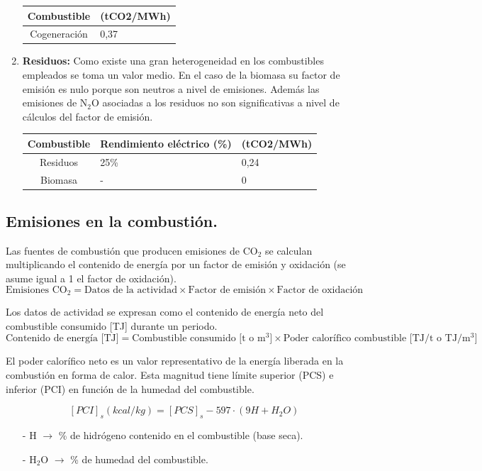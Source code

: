 \begin{enumerate}
\begin{table}[H]
\begin{tabular}{cm{2cm}}
				\textbf{Combustible}  & (tCO2/MWh)\\  
				\hline
				Cogeneración & 0,37
				\\
				\hline
			\end{tabular}
		\end{table}
	\item \textbf{Residuos:}
		Como existe una gran heterogeneidad en los combustibles empleados se toma un valor medio. En el caso de la biomasa su factor de emisión es nulo porque son neutros a nivel de emisiones. Además las emisiones de N$_2$O asociadas a los residuos no son significativas a nivel de cálculos del factor de emisión.
		\begin{table}[H]
			\centering
			\renewcommand{\arraystretch}{1.1}
			\begin{tabular}{cm{2cm}m{2cm}}
				\hline
				\textbf{Combustible} & \textbf{Rendimiento eléctrico (\%)} & (tCO2/MWh)\\  
				\hline
				Residuos &25\%& 0,24
				\\
					Biomasa &-& 0
				\\
				\hline
			\end{tabular}
		\end{table}
\end{enumerate}
\subsection{Emisiones en la combustión.}
Las fuentes de combustión que producen emisiones de CO$_2$ se calculan multiplicando el contenido de energía por un factor de emisión y oxidación (se asume igual a 1 el factor de oxidación).
\[\text{Emisiones CO}_2 = \text{Datos de la actividad} \times \text{Factor de emisión} \times \text{Factor de oxidación}\]

Los datos de actividad se expresan como el contenido de energía neto del combustible consumido [TJ] durante un periodo.
\[\text{Contenido de energía [TJ]}=\text{Combustible consumido [t o m$^3$]}\times \text{Poder calorífico combustible [TJ/t o TJ/m$^3$]}\]

El poder calorífico neto es un valor representativo de la energía liberada en la combustión en forma de calor. Esta magnitud tiene límite superior (PCS) e inferior (PCI) en función de la humedad del combustible.

\[[PCI]_s (kcal/kg)=[PCS]_s-597\cdot (9H+H_2O)\]
\begin{itemize}
	\item [-] H $\rightarrow$ \% de hidrógeno contenido en el combustible (base seca).
	\item [-] H$_2$O $\rightarrow$ \% de humedad del combustible.
\end{itemize}

